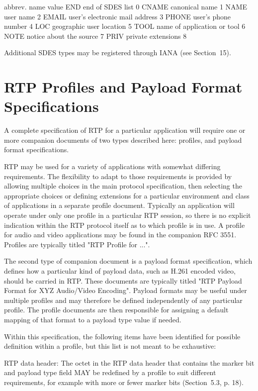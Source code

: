 \documentclass{article}
\begin{document}
abbrev.  name                            value END      end of SDES list                    0 CNAME    canonical name                      1 NAME     user name                           2 EMAIL    user's electronic mail address      3 PHONE    user's phone number                 4 LOC      geographic user location            5 TOOL     name of application or tool         6 NOTE     notice about the source             7 PRIV     private extensions                  8

Additional SDES types may be registered through IANA (see Section~15).

\section{RTP Profiles and Payload Format Specifications}

A complete specification of RTP for a particular application will require one or more companion documents of two types described here: profiles, and payload format specifications.

RTP may be used for a variety of applications with somewhat differing requirements.  The flexibility to adapt to those requirements is provided by allowing multiple choices in the main protocol specification, then selecting the appropriate choices or defining extensions for a particular environment and class of applications in a separate profile document.  Typically an application will operate under only one profile in a particular RTP session, so there is no explicit indication within the RTP protocol itself as to which profile is in use.  A profile for audio and video applications may be found in the companion RFC 3551.  Profiles are typically titled "RTP Profile for ...".

The second type of companion document is a payload format specification, which defines how a particular kind of payload data, such as H.261 encoded video, should be carried in RTP.  These documents are typically titled "RTP Payload Format for XYZ Audio/Video Encoding".  Payload formats may be useful under multiple profiles and may therefore be defined independently of any particular profile.  The profile documents are then responsible for assigning a default mapping of that format to a payload type value if needed.

Within this specification, the following items have been identified for possible definition within a profile, but this list is not meant to be exhaustive:

RTP data header: The octet in the RTP data header that contains the marker bit and payload type field MAY be redefined by a profile to suit different requirements, for example with more or fewer marker bits (Section~5.3, p. 18).
\end{document}
